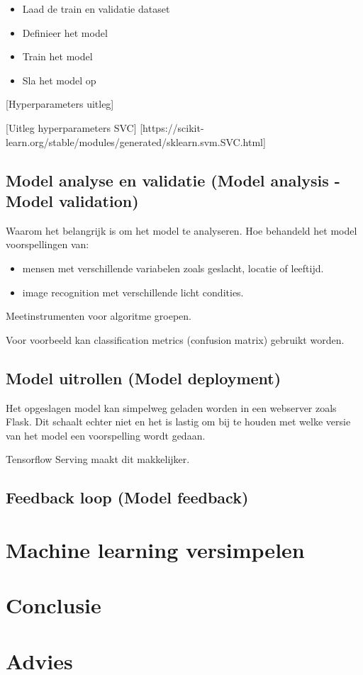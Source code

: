 \begin{itemize}
  \item Laad de train en validatie dataset
  \item Definieer het model
  \item Train het model
  \item Sla het model op
\end{itemize}

[Hyperparameters uitleg]

[Uitleg hyperparameters SVC] [https://scikit-learn.org/stable/modules/generated/sklearn.svm.SVC.html]

\subsection{Model analyse en validatie (Model analysis - Model validation)}\label{subsec:model-analyse-en-validatie}
Waarom het belangrijk is om het model te analyseren. Hoe behandeld het model voorspellingen van:

\begin{itemize}
  \item mensen met verschillende variabelen zoals geslacht, locatie of leeftijd.
  \item image recognition met verschillende licht condities.
\end{itemize}

Meetinstrumenten voor algoritme groepen.

Voor voorbeeld kan classification metrics (confusion matrix) gebruikt worden.

\subsection{Model uitrollen (Model deployment)}\label{subsec:model-uitrollen}
Het opgeslagen model kan simpelweg geladen worden in een webserver zoals Flask. Dit schaalt echter niet en het is lastig om bij te houden met welke versie van het model een voorspelling wordt gedaan.

Tensorflow Serving maakt dit makkelijker.

\subsection{Feedback loop (Model feedback)}\label{subsec:feebdack-loop}


\section{Machine learning versimpelen}\label{sec:machine-learning-versimpelen}


\section{Conclusie}\label{conclusie}


\section{Advies}\label{advies}